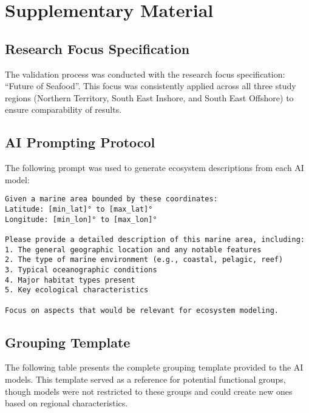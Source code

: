 \section*{Supplementary Material}

\subsection*{Research Focus Specification}
The validation process was conducted with the research focus specification: ``Future of Seafood''. This focus was consistently applied across all three study regions (Northern Territory, South East Inshore, and South East Offshore) to ensure comparability of results.

\subsection*{AI Prompting Protocol}
The following prompt was used to generate ecosystem descriptions from each AI model:

\begin{verbatim}
Given a marine area bounded by these coordinates:
Latitude: [min_lat]° to [max_lat]°
Longitude: [min_lon]° to [max_lon]°

Please provide a detailed description of this marine area, including:
1. The general geographic location and any notable features
2. The type of marine environment (e.g., coastal, pelagic, reef)
3. Typical oceanographic conditions
4. Major habitat types present
5. Key ecological characteristics

Focus on aspects that would be relevant for ecosystem modeling.
\end{verbatim}

\subsection*{Grouping Template}
The following table presents the complete grouping template provided to the AI models. This template served as a reference for potential functional groups, though models were not restricted to these groups and could create new ones based on regional characteristics.

